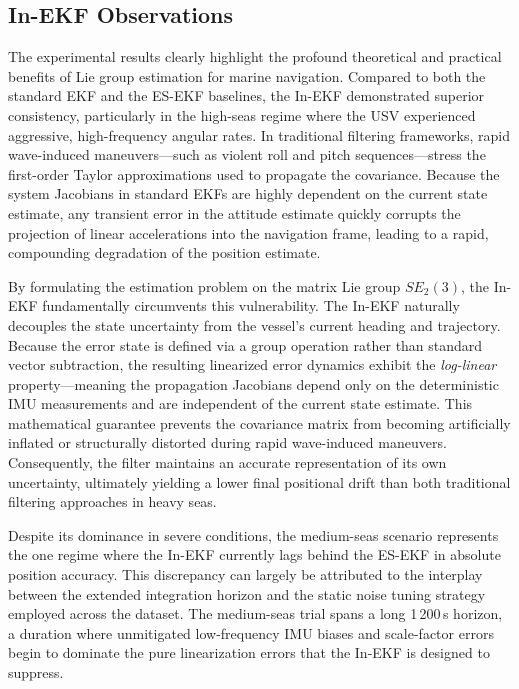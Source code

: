 \documentclass[conference]{IEEEtran}
\begin{document}
\subsection{In-EKF Observations}

The experimental results clearly highlight the profound theoretical and practical benefits of Lie group estimation for marine navigation. Compared to both the standard EKF and the ES-EKF baselines, the In-EKF demonstrated superior consistency, particularly in the high-seas regime where the USV experienced aggressive, high-frequency angular rates. In traditional filtering frameworks, rapid wave-induced maneuvers---such as violent roll and pitch sequences---stress the first-order Taylor approximations used to propagate the covariance. Because the system Jacobians in standard EKFs are highly dependent on the current state estimate, any transient error in the attitude estimate quickly corrupts the projection of linear accelerations into the navigation frame, leading to a rapid, compounding degradation of the position estimate. 

By formulating the estimation problem on the matrix Lie group $SE_2(3)$, the In-EKF fundamentally circumvents this vulnerability. The In-EKF naturally decouples the state uncertainty from the vessel's current heading and trajectory. Because the error state is defined via a group operation rather than standard vector subtraction, the resulting linearized error dynamics exhibit the \emph{log-linear} property---meaning the propagation Jacobians depend only on the deterministic IMU measurements and are independent of the current state estimate. This mathematical guarantee prevents the covariance matrix from becoming artificially inflated or structurally distorted during rapid wave-induced maneuvers. Consequently, the filter maintains an accurate representation of its own uncertainty, ultimately yielding a lower final positional drift than both traditional filtering approaches in heavy seas.

Despite its dominance in severe conditions, the medium-seas scenario represents the one regime where the In-EKF currently lags behind the ES-EKF in absolute position accuracy. This discrepancy can largely be attributed to the interplay between the extended integration horizon and the static noise tuning strategy employed across the dataset. The medium-seas trial spans a long 1\,200\,s horizon, a duration where unmitigated low-frequency IMU biases and scale-factor errors begin to dominate the pure linearization errors that the In-EKF is designed to suppress. 
\end{document}
